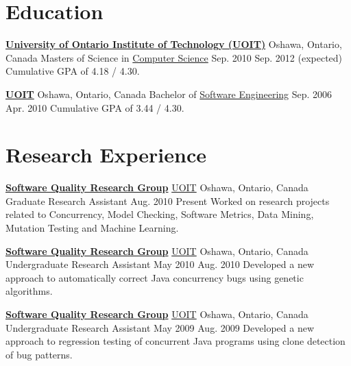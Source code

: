   \section{Education}

  \educationEntry
    {\href{http://www.uoit.ca/}{\textbf{University of Ontario Institute of Technology (UOIT)}}}
    {Oshawa, Ontario, Canada}
    {Masters of Science in \href{http://gradstudies.uoit.ca/EN/main/future\_students/masters\_programs/computerscience.html}{Computer Science}}
    {Sep. 2010}
    {Sep. 2012 (expected)}
    {Cumulative GPA of 4.18 / 4.30.}

  \educationEntry
    {\href{http://www.uoit.ca/}{\textbf{UOIT}}}
    {Oshawa, Ontario, Canada}
    {Bachelor of \href{http://engineering.uoit.ca/undergraduate/software/}{Software Engineering}}
    {Sep. 2006}
    {Apr. 2010}
    {Cumulative GPA of 3.44 / 4.30.}

  \section{Research Experience}

  \researchEntry
    {\href{http://sqrg.ca/}{\textbf{Software Quality Research Group}}}
    {\href{http://www.uoit.ca/}{UOIT}}
    {Oshawa, Ontario, Canada}
    {Graduate Research Assistant}
    {Aug. 2010}
    {Present}
    {Worked on research projects related to Concurrency, Model Checking, Software Metrics, Data Mining, Mutation Testing and Machine Learning.}

  \researchEntry
    {\href{http://sqrg.ca/}{\textbf{Software Quality Research Group}}}
    {\href{http://www.uoit.ca/}{UOIT}}
    {Oshawa, Ontario, Canada}
    {Undergraduate Research Assistant}
    {May 2010}
    {Aug. 2010}
    {Developed a new approach to automatically correct Java concurrency bugs using genetic algorithms.}

  \researchEntry
    {\href{http://sqrg.ca/}{\textbf{Software Quality Research Group}}}
    {\href{http://www.uoit.ca/}{UOIT}}
    {Oshawa, Ontario, Canada}
    {Undergraduate Research Assistant}
    {May 2009}
    {Aug. 2009}
    {Developed a new approach to regression testing of concurrent Java programs using clone detection of bug patterns.}

